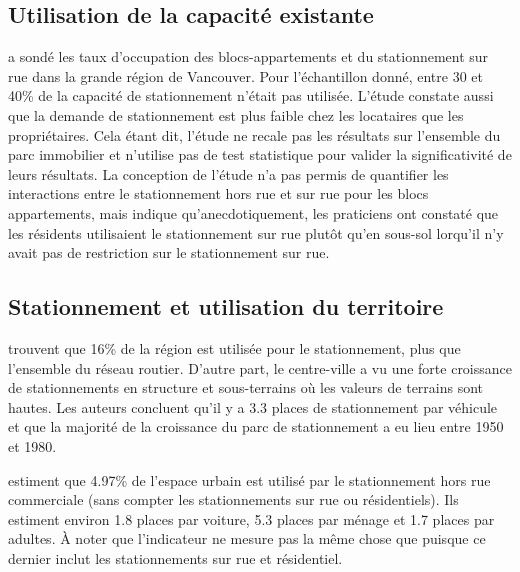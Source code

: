   \subsection{Utilisation de la capacité existante}
    \textcite{Translink:2018Regional:2019} a sondé les taux d'occupation des blocs-appartements et du stationnement sur rue dans la grande région de Vancouver. Pour l'échantillon donné, entre 30 et 40\% de la capacité de stationnement n'était pas utilisée. L'étude constate aussi que la demande de stationnement est plus faible chez les locataires que les propriétaires. Cela étant dit, l'étude ne recale pas les résultats sur l'ensemble du parc immobilier et n'utilise pas de test statistique pour valider la significativité de leurs résultats. La conception de l'étude n'a pas permis de quantifier les interactions entre le stationnement hors rue et sur rue pour les blocs appartements, mais indique qu'anecdotiquement, les praticiens ont constaté que les résidents utilisaient le stationnement sur rue plutôt qu'en sous-sol lorqu'il n'y avait pas de restriction sur le stationnement sur rue. 

  \subsection{Stationnement et utilisation du territoire}
    \textcite{Chester:ParkingInfrastructure:2015} trouvent que 16\% de la région est utilisée pour le stationnement, plus que l'ensemble du réseau routier. D'autre part, le centre-ville a vu une forte croissance de stationnements en structure et sous-terrains où les valeurs de terrains sont hautes. Les auteurs concluent qu'il y a 3.3 places de stationnement par véhicule et que la majorité de la croissance du parc de stationnement a eu lieu entre 1950 et 1980.\par
    \textcite{Davis:EstimatingParking:2010} estiment que 4.97\% de l'espace urbain est utilisé par le stationnement hors rue commerciale (sans compter les stationnements sur rue ou résidentiels). Ils estiment environ 1.8 places par voiture, 5.3 places par ménage et 1.7 places par adultes. À noter que l'indicateur ne mesure pas la même chose que \textcite{Chester:ParkingInfrastructure:2015} puisque ce dernier inclut les stationnements sur rue et résidentiel.
